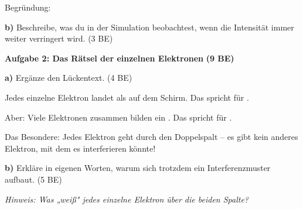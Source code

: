 \documentclass[11pt,a4paper]{article}
\begin{document}
\vspace{0.3em}
Begründung: \hrulefill

\hrulefill

\vspace{0.5em}

\textbf{b)} Beschreibe, was du in der Simulation beobachtest, wenn die Intensität immer weiter verringert wird. \hfill (3 BE)

\vspace{2.5cm}


\textbf{Aufgabe 2: Das Rätsel der einzelnen Elektronen} \hfill \textbf{(9 BE)}

\textbf{a)} Ergänze den Lückentext. \hfill (4 BE)

\begin{tcolorbox}[lueckenbox]
Jedes einzelne Elektron landet als \underline{\hspace{2cm}} auf dem Schirm. Das spricht für \underline{\hspace{3cm}}.

Aber: Viele Elektronen zusammen bilden ein \underline{\hspace{3cm}}. Das spricht für \underline{\hspace{3cm}}.

Das Besondere: Jedes Elektron geht \underline{\hspace{2cm}} durch den Doppelspalt – es gibt kein anderes Elektron, mit dem es interferieren könnte!
\end{tcolorbox}

\newpage

\textbf{b)} Erkläre in eigenen Worten, warum sich trotzdem ein Interferenzmuster aufbaut. \hfill (5 BE)

\textit{Hinweis: Was „weiß" jedes einzelne Elektron über die beiden Spalte?}

\vspace{3.5cm}

\end{document}
